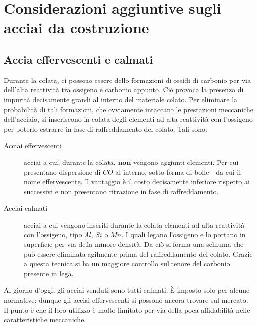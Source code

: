 \chapter{Considerazioni aggiuntive sugli acciai da costruzione}

\section{Accia effervescenti e calmati}\label{sc:AccEffCalm}
Durante la colata, ci possono essere dello formazioni di ossidi di carbonio per via dell'alta 
reattività tra ossigeno e carbonio appunto.
Ciò provoca la presenza di impurità decisamente grandi al interno del materiale colato.
Per eliminare la probabilità di tali formazioni, che ovviamente intaccano le prestazioni 
meccaniche dell'acciaio, si inseriscono in colata degli elementi ad alta reattività con 
l'ossigeno per poterlo estrarre in fase di raffreddamento del colato.
Tali sono:
\begin{description}
\item[Acciai effervescenti] acciai a cui, durante la colata, \textbf{non} vengono aggiunti elementi. Per cui presentano dispersione di $CO$ al interno, sotto forma di bolle - da cui il nome effervescente. Il vantaggio è il costo decisamente inferiore rispetto ai successivi e non presentano ritrazione in fase di raffreddamento.
\item[Acciai calmati] acciai a cui vengono inseriti durante la colata elementi ad alta reattività con l'ossigeno, tipo $Al$, $Si$ o $Mn$. I quali legano l'ossigeno e lo portano in superficie per via della minore densità. Da ciò si forma una schiuma che può essere eliminata agilmente prima del raffreddamento del colato. Grazie a questa tecnica si ha un maggiore controllo sul tenore del carbonio presente in lega. 
\end{description}
Al giorno d'oggi, gli acciai venduti sono tutti calmati. È imposto solo per alcune normative: dunque gli acciai effervescenti si possono ancora trovare sul mercato. Il punto è che il loro utilizzo è molto limitato per via della poca affidabilità nelle caratteristiche meccaniche.